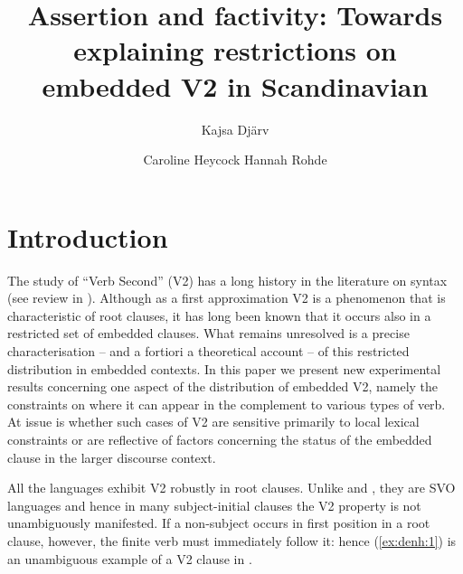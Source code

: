\documentclass[output=paper]{langsci/langscibook}
\author{Kajsa Djärv\affiliation{University of Pennsylvania}\and 
Caroline Heycock\affiliation{University of Edinburgh}\lastand
Hannah Rohde \affiliation{University of Edinburgh}}
\title{Assertion and factivity: Towards explaining restrictions on embedded V2 in Scandinavian}
\begin{document}
\section{Introduction}

The study of ``Verb Second'' (V2) has a long history in the literature on  syntax (see review in \citealt{Holmberg2013}). Although as a first approximation V2 is a phenomenon that is characteristic of root clauses, it has long been known that it occurs also in a restricted set of embedded clauses. What remains unresolved is a precise characterisation -- and a fortiori a theoretical account -- of this restricted distribution in embedded contexts. In this paper we present new experimental results concerning one aspect of the distribution of embedded V2, namely the constraints on where it can appear in the complement to various types of verb. At issue is whether such cases of V2 are sensitive primarily to local lexical constraints or are reflective of  factors concerning the status of the embedded clause in the larger discourse context.

All the  languages exhibit V2 robustly in root clauses. Unlike  and , they are SVO languages and hence in many subject-initial clauses the V2 property is not unambiguously manifested. If a non-subject occurs in first position in a root clause, however, the finite verb must immediately follow it: hence (\ref{ex:denh:1}) is an unambiguous example of a V2 clause in .%



\end{document}
